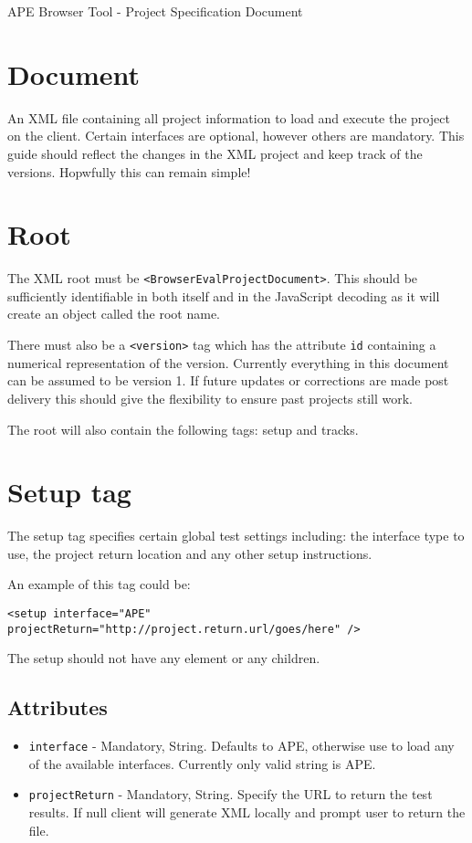 \documentclass{article}
\begin{document}
\large APE Browser Tool - Project Specification Document

\section{Document}

An XML file containing all project information to load and execute the project on the client. Certain interfaces are optional, however others are mandatory. This guide should reflect the changes in the XML project and keep track of the versions. Hopwfully this can remain simple!

\section{Root}

The XML root must be \texttt{<BrowserEvalProjectDocument>}. This should be sufficiently identifiable in both itself and in the JavaScript decoding as it will create an object called the root name.

There must also be a \texttt{<version>} tag which has the attribute \texttt{id} containing a numerical representation of the version. Currently everything in this document can be assumed to be version 1. If future updates or corrections are made post delivery this should give the flexibility to ensure past projects still work.

The root will also contain the following tags: setup and tracks.

\section{Setup tag}

The setup tag specifies certain global test settings including: the interface type to use, the project return location and any other setup instructions.

An example of this tag could be:

\texttt{<setup interface="APE" projectReturn="http://project.return.url/goes/here" />}

The setup should not have any element or any children.

\subsection{Attributes}
\begin{itemize}
\item \texttt{interface} - Mandatory, String. Defaults to APE, otherwise use to load any of the available interfaces. Currently only valid string is APE.
\item \texttt{projectReturn} - Mandatory, String. Specify the URL to return the test results. If null client will generate XML locally and prompt user to return the file.
\end{itemize}
\end{document}
